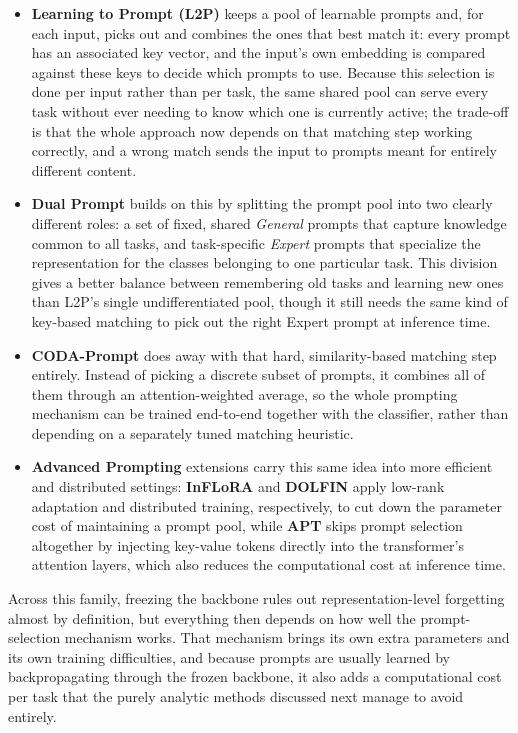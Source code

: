 \begin{itemize}
	\item \textbf{Learning to Prompt (L2P)} \cite{wang2022learning} keeps a pool of learnable prompts and, for each input, picks out and combines the ones that best match it: every prompt has an associated key vector, and the input's own embedding is compared against these keys to decide which prompts to use. Because this selection is done per input rather than per task, the same shared pool can serve every task without ever needing to know which one is currently active; the trade-off is that the whole approach now depends on that matching step working correctly, and a wrong match sends the input to prompts meant for entirely different content.
	\item \textbf{Dual Prompt} \cite{wang2022dualprompt} builds on this by splitting the prompt pool into two clearly different roles: a set of fixed, shared \emph{General} prompts that capture knowledge common to all tasks, and task-specific \emph{Expert} prompts that specialize the representation for the classes belonging to one particular task. This division gives a better balance between remembering old tasks and learning new ones than L2P's single undifferentiated pool, though it still needs the same kind of key-based matching to pick out the right Expert prompt at inference time.
	\item \textbf{CODA-Prompt} \cite{Smith_2023_CVPR} does away with that hard, similarity-based matching step entirely. Instead of picking a discrete subset of prompts, it combines all of them through an attention-weighted average, so the whole prompting mechanism can be trained end-to-end together with the classifier, rather than depending on a separately tuned matching heuristic.
	\item \textbf{Advanced Prompting} extensions carry this same idea into more efficient and distributed settings: \textbf{InFLoRA} \cite{liang2024inflora} and \textbf{DOLFIN} \cite{dolfin} apply low-rank adaptation and distributed training, respectively, to cut down the parameter cost of maintaining a prompt pool, while \textbf{APT} \cite{Chen_2025_ICCV} skips prompt selection altogether by injecting key-value tokens directly into the transformer's attention layers, which also reduces the computational cost at inference time.
\end{itemize}

Across this family, freezing the backbone rules out representation-level forgetting almost by definition, but everything then depends on how well the prompt-selection mechanism works. That mechanism brings its own extra parameters and its own training difficulties, and because prompts are usually learned by backpropagating through the frozen backbone, it also adds a computational cost per task that the purely analytic methods discussed next manage to avoid entirely.

